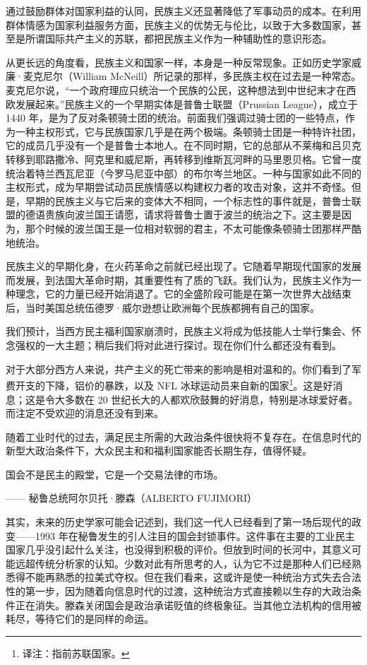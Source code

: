通过鼓励群体对国家利益的认同，民族主义还显著降低了军事动员的成本。在利用群体情感为国家利益服务方面，民族主义的优势无与伦比，以致于大多数国家，甚至是所谓国际共产主义的苏联，都把民族主义作为一种辅助性的意识形态。

从更长远的角度看，民族主义和国家一样，本身是一种反常现象。正如历史学家威廉·麦克尼尔（William McNeill）所记录的那样，多民族主权在过去是一种常态。麦克尼尔说，“一个政府理应只统治一个民族的公民，这种想法到中世纪末才在西欧发展起来。”民族主义的一个早期实体是普鲁士联盟（Prussian League），成立于 1440 年，是为了反对条顿骑士团的统治。前面我们强调过骑士团的一些特点，作为一种主权形式，它与民族国家几乎是在两个极端。条顿骑士团是一种特许社团，它的成员几乎没有一个是普鲁士本地人。在不同时期，它的总部从不莱梅和吕贝克转移到耶路撒冷、阿克里和威尼斯，再转移到维斯瓦河畔的马里恩贝格。它曾一度统治着特兰西瓦尼亚（今罗马尼亚中部）的布尔岑兰地区。一种与国家如此不同的主权形式，成为早期尝试动员民族情感以构建权力者的攻击对象，这并不奇怪。但是，早期的民族主义与它后来的变体大不相同，一个标志性的事件就是，普鲁士联盟的德语贵族向波兰国王请愿，请求将普鲁士置于波兰的统治之下。这主要是因为，那个时候的波兰国王是一位相对软弱的君主，不太可能像条顿骑士团那样严酷地统治。

民族主义的早期化身，在火药革命之前就已经出现了。它随着早期现代国家的发展而发展，到法国大革命时期，其重要性有了质的飞跃。我们认为，民族主义作为一种理念，它的力量已经开始消退了。它的全盛阶段可能是在第一次世界大战结束后，当时美国总统伍德罗·威尔逊想让欧洲每个民族都拥有自己的国家。

我们预计，当西方民主福利国家崩溃时，民族主义将成为低技能人士举行集会、怀念强权的一大主题；稍后我们将对此进行探讨。现在你们什么都还没有看到。

对于大部分西方人来说，共产主义的死亡带来的影响是相对温和的。你们看到了军费开支的下降，铝价的暴跌，以及 NFL 冰球运动员来自新的国家\footnote{译注：指前苏联国家。}。这是好消息；这是令大多数在 20 世纪长大的人都欢欣鼓舞的好消息，特别是冰球爱好者。而注定不受欢迎的消息还没有到来。

随着工业时代的过去，满足民主所需的大政治条件很快将不复存在。在信息时代的新型大政治条件下，大众民主和和福利国家能否长期生存，值得怀疑。

\begin{tcolorbox}
国会不是民主的殿堂，它是一个交易法律的市场。
\begin{flushright}
—— 秘鲁总统阿尔贝托·滕森（ALBERTO FUJIMORI）
\end{flushright}
\end{tcolorbox}

其实，未来的历史学家可能会记述到，我们这一代人已经看到了第一场后现代的政变——1993 年在秘鲁发生的引人注目的国会封锁事件。这件事在主要的工业民主国家几乎没引起什么关注，也没得到积极的评价。但放到时间的长河中，其意义可能远超传统分析家的认知。少数对此有所思考的人，认为它不过是那种人们已经熟悉得不能再熟悉的拉美式夺权。但在我们看来，这或许是使一种统治方式失去合法性的第一步，因为随着向信息时代的过渡，这种统治方式直接赖以生存的大政治条件正在消失。滕森关闭国会是政治承诺贬值的终极象征。当其他立法机构的信用被耗尽，等待它们的是同样的命运。

